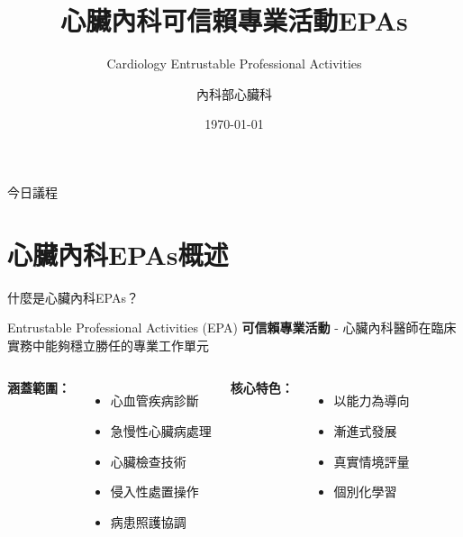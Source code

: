 \documentclass[aspectratio=169]{beamer}
\title{心臟內科可信賴專業活動EPAs}
\subtitle{Cardiology Entrustable Professional Activities}
\author{內科部心臟科}
\date{\today}
\institute{醫學中心}
\begin{document}
\begin{frame}
\titlepage
\end{frame}

\begin{frame}{今日議程}
\tableofcontents
\end{frame}

\section{心臟內科EPAs概述}

\begin{frame}{什麼是心臟內科EPAs？}
\begin{block}{Entrustable Professional Activities (EPA)}
\textbf{可信賴專業活動} - 心臟內科醫師在臨床實務中能夠穩立勝任的專業工作單元
\end{block}

\vspace{0.5cm}

\begin{columns}[c]
\textbf{涵蓋範圍：}
\begin{itemize}
\item 心血管疾病診斷
\item 急慢性心臟病處理
\item 心臟檢查技術
\item \textcolor{emergency_red}{侵入性處置操作}
\item 病患照護協調
\end{itemize}

\textbf{核心特色：}
\begin{itemize}
\item 以能力為導向
\item 漸進式發展
\item 真實情境評量
\item 個別化學習
\end{itemize}
\end{columns}
\end{frame}
\end{document}

